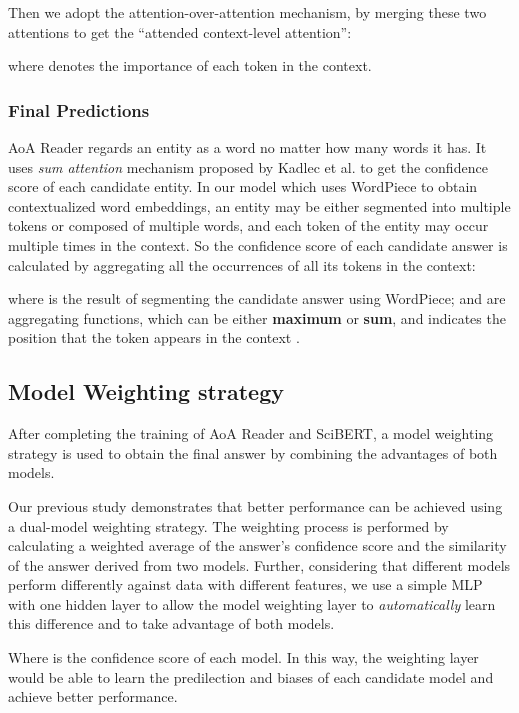 \documentclass[sigconf, screen]{acmart}
\newcommand{\scibert}{Sci\-BERT\xspace}
\newcommand{\aoa}{AoA Reader\xspace}
\begin{document}
Then we adopt the attention-over-attention mechanism, by merging these two attentions to get the ``attended context-level attention'':

where  denotes the importance of each token in the context.

\subsubsection{Final Predictions}
\aoa regards an entity as a word no matter how many words it has. It uses \emph{sum attention} mechanism proposed by Kadlec et al. \cite{kadlecTextUnderstandingAttention2016} to get the confidence score of each candidate entity. In our model which uses WordPiece to obtain contextualized word embeddings, an entity may be either segmented into multiple tokens or composed of multiple words, and each token of the entity may occur multiple times in the context. So the confidence score of each candidate answer  is calculated by aggregating all the occurrences of all its tokens in the context:

where  is the result of segmenting the candidate answer  using WordPiece;  and  are aggregating functions, which can be either \textbf{maximum} or \textbf{sum}, and  indicates the position that the token  appears in the context .


\subsection{Model Weighting strategy}
After completing the training of \aoa and \scibert, a model weighting strategy is used to obtain the final answer by combining the advantages of both models.



Our previous study \cite{duDualModelWeighting2021} demonstrates that better performance can be achieved using a dual-model weighting strategy. The weighting process is performed by calculating a weighted average of the answer's confidence score and the similarity of the answer derived from two models. Further, considering that different models perform differently against data with different features, we use a simple MLP with one hidden layer to allow the model weighting layer to \emph{automatically} learn this difference and to take advantage of both models.

Where  is the confidence score of each model.
In this way, the weighting layer would be able to learn the predilection and biases of each candidate model and achieve better performance.
\end{document}
